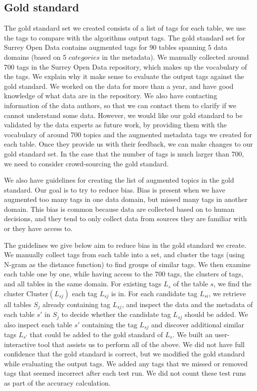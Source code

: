 \subsection{Gold standard}
\label{ssec:GoldStandard}

The gold standard set we created consists of a list of tags for each table, we use the tags to compare with the algorithms output tags. The gold standard set for Surrey Open Data contains augmented tags for 90 tables spanning 5 data domains (based on 5 $categories$ in the metadata). We manually collected around 700 tags in the Surrey Open Data repository, which makes up the vocabulary of the tags. We explain why it make sense to evaluate the output tags against the gold standard. We worked on the data for more than a year, and have good knowledge of what data are in the repository. We also have contacting information of the data authors, so that we can contact them to clarify if we cannot understand some data. However, we would like our gold standard to be validated by the data experts as future work, by providing them with the vocabulary of around 700 topics and the augmented metadata tags we created for each table. Once they provide us with their feedback, we can make changes to our gold standard set. In the case that the number of tags is much larger than 700, we need to consider crowd-sourcing the gold standard.

We also have guidelines for creating the list of augmented topics in the gold standard. Our goal is to try to reduce bias. Bias is present when we have augmented too many tags in one data domain, but missed many tags in another domain. This bias is common because data are collected based on to human decisions, and they tend to only collect data from sources they are familiar with or they have access to.

The guidelines we give below aim to reduce bias in the gold standard we create. We manually collect tags from each table into a set, and cluster the tags (using N-gram as the distance function) to find groups of similar tags. We then examine each table one by one, while having access to the 700 tags, the clusters of tags, and all tables in the same domain. For existing tags $L_{s}$ of the table $s$, we find the cluster $\text{Cluster}(L_{sj})$ each tag $L_{sj}$ is in. For each candidate tag $L_{si}$, we retrieve all tables $S_{j}$ already containing tag $L_{sj}$, and inspect the data and the metadata of each table $s'$ in $S_{j}$ to decide whether the candidate tag $L_{sj}$ should be added. We also inspect each table $s'$ containing the tag $L_{sj}$ and discover additional similar tags $L_{s'}$ that could be added to the gold standard of $L_{s}$. We built an user-interactive tool that assists us to perform all of the above. We did not have full confidence that the gold standard is correct, but we modified the gold standard while evaluating the output tags. We added any tags that we missed or removed tags that seemed incorrect after each test run. We did not count these test runs as part of the accuracy calculation.

